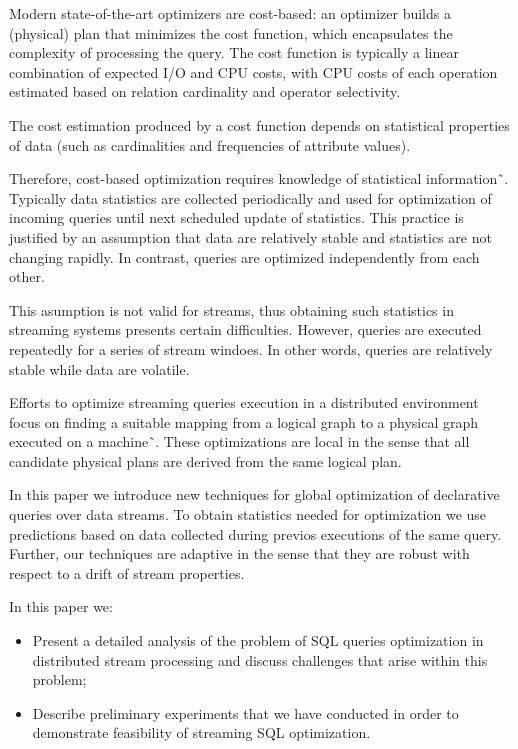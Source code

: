 Modern state-of-the-art optimizers are cost-based: an optimizer builds a (physical) plan that minimizes the cost function, which encapsulates the complexity of processing  the query. 
The cost function is typically a linear combination of expected I/O and CPU costs, with CPU costs of each operation estimated based on relation cardinality and operator selectivity. 

The cost estimation produced by a cost function depends on statistical properties of data (such as cardinalities and frequencies of attribute values). 

Therefore, cost-based optimization requires knowledge of statistical information˜\cite{Neumann2018optimization}.  Typically data statistics are collected periodically and used for optimization of incoming queries until next scheduled update of statistics. This practice is justified by an assumption that data are relatively stable and statistics are not changing rapidly. In contrast, queries are optimized independently from each other. 

This asumption is not valid for streams, thus obtaining such statistics  in streaming systems presents certain difficulties. However, queries are executed repeatedly for a series of stream windoes. In other words, queries are relatively stable while data are volatile.

Efforts to optimize streaming queries execution in a distributed environment focus on finding a suitable mapping from a logical graph to a physical graph executed on a machine˜\cite{grulich2020grizzly, gedik2009code, kroll2019arc, schneider2012auto, gedik2008spade}.
These optimizations are local in the sense that all candidate physical plans are derived from the same logical plan.  

In this paper we introduce new techniques for global optimization of declarative queries over data streams. To obtain statistics needed for optimization we use predictions based on data collected during previos executions of the same query. Further, our techniques are adaptive in the sense that they are robust with respect to a drift of stream properties. 

In this paper we:
\begin{itemize}
    \item Present a detailed analysis of the problem of SQL queries optimization in distributed stream processing and discuss challenges that arise within this problem;
    \item Describe preliminary experiments that we have conducted in order to demonstrate feasibility of streaming SQL optimization.
\end{itemize}

